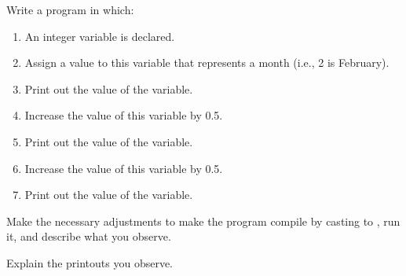 Write a program in which:
\begin{enumerate}
  \item An integer variable is declared.
  \item Assign a value to this variable that represents a month (i.e., 2 is February).
  \item Print out the value of the variable.
  \item Increase the value of this variable by 0.5.
  \item Print out the value of the variable.
  \item Increase the value of this variable by 0.5.
  \item Print out the value of the variable.
\end{enumerate}

Make the necessary adjustments to make the program compile by casting to , run it, and describe what you observe.

Explain the printouts you observe.

